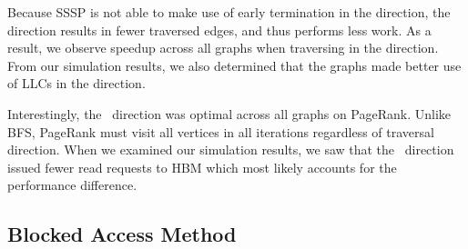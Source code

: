 Because SSSP is not able to make use of early termination in the \pull direction, the \push direction results in fewer traversed edges, and thus performs less work.
As a result, we observe speedup across all graphs when traversing in the \push direction.
From our simulation results, we also determined that the graphs made better use of LLCs in the \push direction.
 
Interestingly, the \pull~direction was optimal across all graphs on PageRank.
Unlike BFS, PageRank must visit all vertices in all iterations regardless of traversal direction.
When we examined our simulation results, we saw that the \pull~direction issued fewer read requests to HBM which most likely accounts for the performance difference.  

 
 
 
\subsection{Blocked Access Method}


